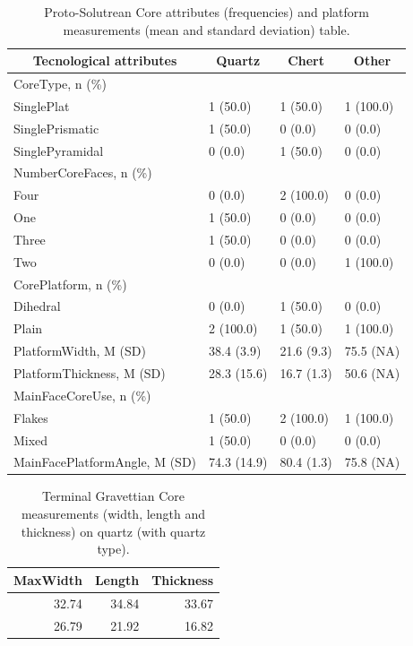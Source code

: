 \documentclass[12pt,twoside]{reedthesis}
\begin{document}
\begin{table}

\caption{\label{tab:unnamed-chunk-70}Proto-Solutrean Core attributes (frequencies) and platform measurements (mean and standard deviation) table.}
\centering
\begin{tabular}[t]{llll}
\toprule
\multicolumn{1}{c}{\textbf{Tecnological attributes}} & \multicolumn{1}{c}{\textbf{Quartz}} & \multicolumn{1}{c}{\textbf{Chert}} & \multicolumn{1}{c}{\textbf{Other}}\\
\midrule
CoreType, n (\%) &  &  & \\
SinglePlat & 1 (50.0) & 1 (50.0) & 1 (100.0)\\
SinglePrismatic & 1 (50.0) & 0 (0.0) & 0 (0.0)\\
SinglePyramidal & 0 (0.0) & 1 (50.0) & 0 (0.0)\\
NumberCoreFaces, n (\%) &  &  & \\
\addlinespace
Four & 0 (0.0) & 2 (100.0) & 0 (0.0)\\
One & 1 (50.0) & 0 (0.0) & 0 (0.0)\\
Three & 1 (50.0) & 0 (0.0) & 0 (0.0)\\
Two & 0 (0.0) & 0 (0.0) & 1 (100.0)\\
CorePlatform, n (\%) &  &  & \\
\addlinespace
Dihedral & 0 (0.0) & 1 (50.0) & 0 (0.0)\\
Plain & 2 (100.0) & 1 (50.0) & 1 (100.0)\\
PlatformWidth, M (SD) & 38.4 (3.9) & 21.6 (9.3) & 75.5 (NA)\\
PlatformThickness, M (SD) & 28.3 (15.6) & 16.7 (1.3) & 50.6 (NA)\\
MainFaceCoreUse, n (\%) &  &  & \\
\addlinespace
Flakes & 1 (50.0) & 2 (100.0) & 1 (100.0)\\
Mixed & 1 (50.0) & 0 (0.0) & 0 (0.0)\\
MainFacePlatformAngle, M (SD) & 74.3 (14.9) & 80.4 (1.3) & 75.8 (NA)\\
\bottomrule
\end{tabular}
\end{table}
\begin{table}

\caption{\label{tab:unnamed-chunk-71}Terminal Gravettian Core measurements (width, length and thickness) 
             on quartz (with quartz type).}
\centering
\begin{tabular}[t]{rrr}
\toprule
\multicolumn{1}{c}{\textbf{MaxWidth}} & \multicolumn{1}{c}{\textbf{Length}} & \multicolumn{1}{c}{\textbf{Thickness}}\\
\midrule
32.74 & 34.84 & 33.67\\
26.79 & 21.92 & 16.82\\
\bottomrule
\end{tabular}
\end{table}
\end{document}
